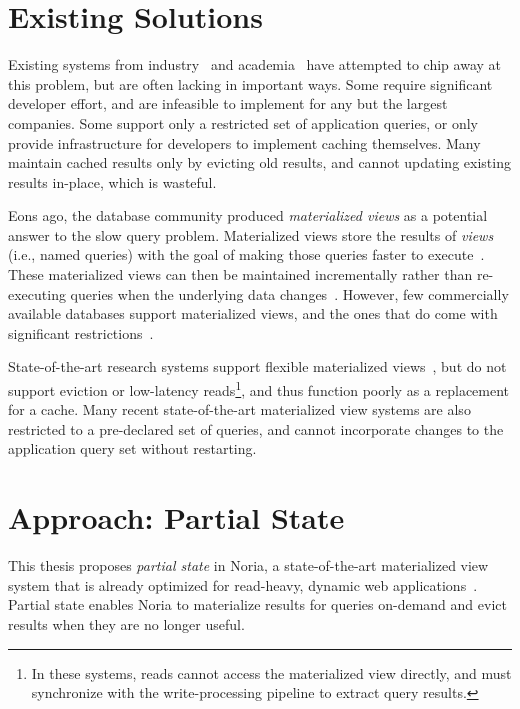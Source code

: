 \section{Existing Solutions}

Existing systems from industry~\cite{facebook-memcache, tao, flannel} and
academia~\cite{txcache, cachegenie, casql-consistency-thesis, pequod} have
attempted to chip away at this problem, but are often lacking in important ways.
Some require significant developer effort, and are infeasible to implement for
any but the largest companies. Some support only a restricted set of application
queries, or only provide infrastructure for developers to implement caching
themselves. Many maintain cached results only by evicting old results, and
cannot updating existing results in-place, which is wasteful.


Eons ago, the database community produced \textit{materialized views} as a
potential answer to the slow query problem. Materialized views store the results
of \textit{views} (i.e., named queries) with the goal of making those queries
faster to execute~\cite{materialized-views}. These materialized views can then
be maintained incrementally rather than re-executing queries when the underlying
data changes~\cite{materialized-survey}. However, few commercially available
databases support materialized views, and the ones that do come with significant
restrictions~\cite{mssql-materialized-view-restrictions}.

State-of-the-art research systems support flexible materialized
views~\cite{dbtoaster,materialize}, but do not support eviction or low-latency
reads\footnote{In these systems, reads cannot access the materialized view
directly, and must synchronize with the write-processing pipeline to extract
query results.}, and thus function poorly as a replacement for a cache. Many
recent state-of-the-art materialized view systems are also restricted to a
pre-declared set of queries, and cannot incorporate changes to the application
query set without restarting.

\section{Approach: Partial State}

This thesis proposes \textit{partial state} in Noria, a state-of-the-art
materialized view system that is already optimized for read-heavy, dynamic web
applications~\cite{noria}. Partial state enables Noria to materialize results
for queries on-demand and evict results when they are no longer useful.

